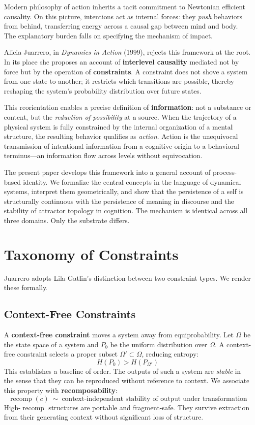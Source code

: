 \documentclass[11pt]{article}
\newcommand{\recomp}{\operatorname{recomp}}
\begin{document}
Modern philosophy of action inherits a tacit commitment to Newtonian efficient causality.
On this picture, intentions act as internal forces: they \emph{push} behaviors from
behind, transferring energy across a causal gap between mind and body. The explanatory
burden falls on specifying the mechanism of impact.

Alicia Juarrero, in \textit{Dynamics in Action} (1999), rejects this framework at the root.
In its place she proposes an account of \textbf{interlevel causality} mediated not by
force but by the operation of \textbf{constraints}. A constraint does not shove a system
from one state to another; it restricts which transitions are possible, thereby reshaping
the system's probability distribution over future states.

This reorientation enables a precise definition of \textbf{information}: not a substance
or content, but the \emph{reduction of possibility} at a source. When the trajectory of a
physical system is fully constrained by the internal organization of a mental structure,
the resulting behavior qualifies as \emph{action}. Action is the unequivocal transmission
of intentional information from a cognitive origin to a behavioral terminus—an information
flow across levels without equivocation.

The present paper develops this framework into a general account of process-based identity.
We formalize the central concepts in the language of dynamical systems, interpret them
geometrically, and show that the persistence of a self is structurally continuous with the
persistence of meaning in discourse and the stability of attractor topology in cognition.
The mechanism is identical across all three domains. Only the substrate differs.

\section{Taxonomy of Constraints}

Juarrero adopts Lila Gatlin's distinction between two constraint types. We render these
formally.

\subsection{Context-Free Constraints}

A \textbf{context-free constraint} moves a system away from equiprobability. Let $\Omega$
be the state space of a system and $P_0$ be the uniform distribution over $\Omega$.
A context-free constraint selects a proper subset $\Omega' \subset \Omega$, reducing
entropy:
\[
H(P_0) > H(P_{\Omega'})
\]
This establishes a baseline of order. The outputs of such a system are \emph{stable} in
the sense that they can be reproduced without reference to context. We associate this
property with \textbf{recomposability}:
\[
\recomp(c) \;\sim\; \text{context-independent stability of output under transformation}
\]
High-$\recomp$ structures are portable and fragment-safe. They survive extraction from
their generating context without significant loss of structure.
\end{document}
